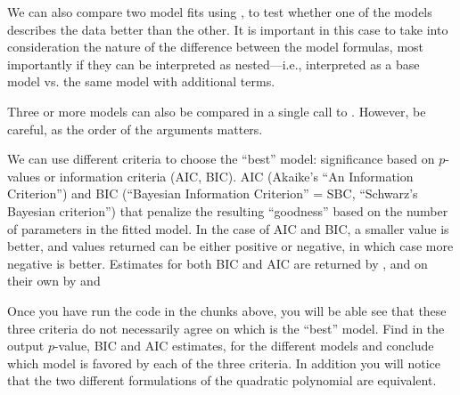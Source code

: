\documentclass[krantz2]{krantz}\usepackage{knitr}
\begin{document}
\begin{playground}
We can also compare two model fits using , to test whether one of the models describes the data better than the other. It is important in this case to take into consideration the nature of the difference between the model formulas, most importantly if they can be interpreted as nested---i.e., interpreted as a base model vs. the same model with additional terms.

\begin{knitrout}\footnotesize
{}\color{fgcolor}\begin{kframe}
\begin{alltt}
\end{alltt}
\end{kframe}
\end{knitrout}

Three or more models can also be compared in a single call to . However, be careful, as the order of the arguments matters.

\begin{knitrout}\footnotesize
{}\color{fgcolor}\begin{kframe}
\begin{alltt}
\end{alltt}
\end{kframe}
\end{knitrout}

We can use different criteria to choose the ``best'' model: significance based on $p$-values or information criteria (AIC, BIC). AIC (Akaike's ``An Information Criterion'') and BIC (``Bayesian Information Criterion'' = SBC, ``Schwarz's Bayesian criterion'') that penalize the resulting ``goodness'' based on the number of parameters in the fitted model. In the case of AIC and BIC, a smaller value is better, and values returned can be either positive or negative, in which case more negative is better. Estimates for both BIC and AIC are returned by , and on their own by  and 

\begin{knitrout}\footnotesize
{}\color{fgcolor}\begin{kframe}
\begin{alltt}
\end{alltt}
\end{kframe}
\end{knitrout}

Once you have run the code in the chunks above, you will be able see that these three criteria do not necessarily agree on which is the ``best'' model. Find in the output $p$-value, BIC and AIC estimates, for the different models and conclude which model is favored by each of the three criteria. In addition you will notice that the two different formulations of the quadratic polynomial are equivalent.

\end{playground}
\end{document}
